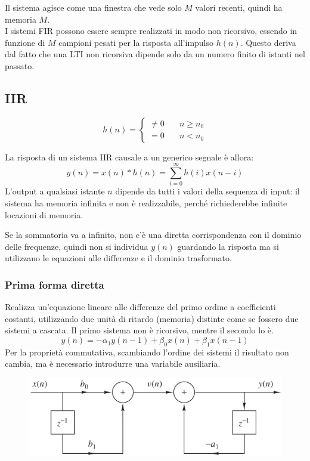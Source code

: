 Il sistema agisce come una finestra che vede solo $M$ valori recenti, quindi ha memoria $M$. \\
I sistemi FIR possono essere sempre realizzati in modo non ricorsivo, essendo in funzione di $M$ campioni pesati per la risposta all'impulso $h(n)$. Questo deriva dal fatto che una LTI non ricorsiva dipende solo da un numero finito di istanti nel passato.

\subsection{IIR}
$$h(n) = \begin{cases}
\neq 0 & \quad n \geq n_0 \\
= 0 & \quad n < n_0
\end{cases}$$

La risposta di un sistema IIR causale a un generico segnale è allora:
$$y(n) = x(n) * h(n) = \sum_{i = 0}^{\infty} h(i)x(n - i)$$
L'output a qualsiasi istante $n$ dipende da tutti i valori della sequenza di input: il sistema ha memoria infinita e non è realizzabile, perché richiederebbe infinite locazioni di memoria. 

Se la sommatoria va a infinito, non c'è una diretta corrispondenza con il dominio delle frequenze, quindi non si individua $y(n)$ guardando la risposta ma si utilizzano le equazioni alle differenze e il dominio trasformato.

\subsubsection{Prima forma diretta}
Realizza un'equazione lineare alle differenze del primo ordine a coefficienti costanti, utilizzando due unità di ritardo (memoria) distinte come se fossero due sistemi a cascata. Il primo sistema non è ricorsivo, mentre il secondo lo è.
$$y(n) = -\alpha_1y(n-1) + \beta_0x(n) + \beta_1x(n-1)$$
Per la proprietà commutativa, scambiando l'ordine dei sistemi il risultato non cambia, ma è necessario introdurre una variabile ausiliaria.
\begin{figure}[h]
	\centering
	\includegraphics[scale=0.4]{Lezioni/Immagini/diretta1}
\end{figure}

